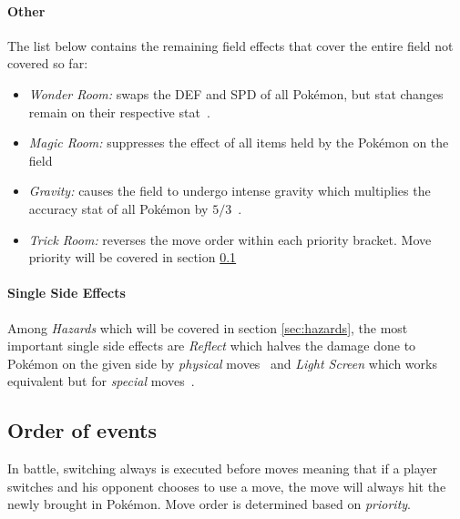 \paragraph{Other}
The list below contains the remaining field effects that cover the entire field not covered so far:
\begin{itemize}
	\item \textit{Wonder Room:} swaps the \ac{DEF} and \ac{SPD} of all Pokémon, but stat changes
	remain on their respective stat~\autocite{Bulbapedia:WonderRoom}. 
	\item \textit{Magic Room:} suppresses the effect of all items held by the Pokémon on the field~\autocite{Bulbapedia:MagicRoom}
	\item \textit{Gravity:} causes the field to undergo intense gravity which multiplies the accuracy stat of
	all Pokémon by $5/3$~\autocite{Bulbapedia:Gravity}.
	\item \textit{Trick Room:} reverses the move order within each priority bracket. Move priority will be covered
	in section \ref{sec:order-of-events}
\end{itemize}

\paragraph{Single Side Effects}
Among \textit{Hazards} which will be covered in section \ref{sec:hazards}, the most important single side
effects are \textit{Reflect} which halves the damage done to Pokémon on the given side by \textit{physical}
moves~\autocite{Bulbapedia:Reflect} and \textit{Light Screen} which works
equivalent but for \textit{special} moves~\autocite{Bulbapedia:LightScreen}.

\subsection{Order of events}
\label{sec:order-of-events}
In battle, switching always is executed before moves meaning that if a player switches and his opponent chooses
to use a move, the move will always hit the newly brought in Pokémon. Move order is determined based on
\textit{priority}.
